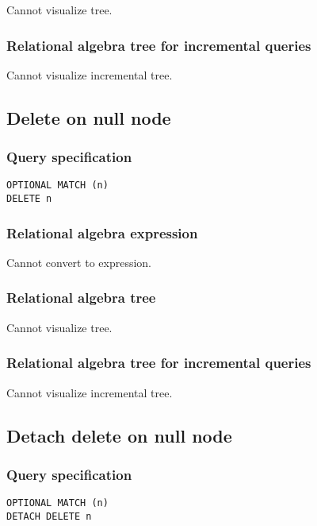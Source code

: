 Cannot visualize tree.

\subsubsection*{Relational algebra tree for incremental queries}

Cannot visualize incremental tree.

\subsection{Delete on null node}

\subsubsection*{Query specification}

\begin{lstlisting}
OPTIONAL MATCH (n)
DELETE n
\end{lstlisting}

\subsubsection*{Relational algebra expression}

Cannot convert to expression.

\subsubsection*{Relational algebra tree}

Cannot visualize tree.

\subsubsection*{Relational algebra tree for incremental queries}

Cannot visualize incremental tree.

\subsection{Detach delete on null node}

\subsubsection*{Query specification}

\begin{lstlisting}
OPTIONAL MATCH (n)
DETACH DELETE n
\end{lstlisting}

